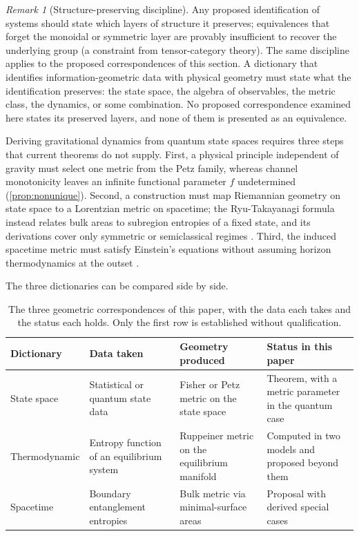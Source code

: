 \documentclass[11pt,letterpaper]{article}
\theoremstyle{definition}
\theoremstyle{remark}
\newtheorem{remark}[theorem]{Remark}
\begin{document}
\begin{remark}[Structure-preserving discipline]
\label{rem:preservation}
Any proposed identification of systems should state which layers of structure it preserves; equivalences that forget the monoidal or symmetric layer are provably insufficient to recover the underlying group (a constraint from tensor-category theory). The same discipline applies to the proposed correspondences of this section. A dictionary that identifies information-geometric data with physical geometry must state what the identification preserves: the state space, the algebra of observables, the metric class, the dynamics, or some combination. No proposed correspondence examined here states its preserved layers, and none of them is presented as an equivalence.
\end{remark}


Deriving gravitational dynamics from quantum state spaces requires three steps that current theorems do not supply. First, a physical principle independent of gravity must select one metric from the Petz family, whereas channel monotonicity leaves an infinite functional parameter $f$ undetermined (\cref{prop:nonunique}). Second, a construction must map Riemannian geometry on state space to a Lorentzian metric on spacetime; the Ryu-Takayanagi formula instead relates bulk areas to subregion entropies of a fixed state, and its derivations cover only symmetric or semiclassical regimes \cite{chc, lm, dlr}. Third, the induced spacetime metric must satisfy Einstein's equations without assuming horizon thermodynamics at the outset \cite{jacobson}.

The three dictionaries can be compared side by side.

\begin{table}[ht]
\centering
\small
\begin{tabular}{L{0.19\textwidth} L{0.24\textwidth} L{0.24\textwidth} L{0.21\textwidth}}
\toprule
Dictionary & Data taken & Geometry produced & Status in this paper \\
\midrule
State space & Statistical or quantum state data & Fisher or Petz metric on the state space & Theorem, with a metric parameter in the quantum case \\
Thermodynamic & Entropy function of an equilibrium system & Ruppeiner metric on the equilibrium manifold & Computed in two models and proposed beyond them \\
Spacetime & Boundary entanglement entropies & Bulk metric via minimal-surface areas & Proposal with derived special cases \\
\bottomrule
\end{tabular}
\caption{The three geometric correspondences of this paper, with the data each takes and the status each holds. Only the first row is established without qualification.}
\label{tab:dictionaries}
\end{table}
\end{document}
